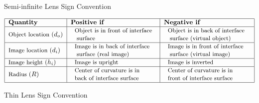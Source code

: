 \documentclass{article}
\begin{document}
Semi-infinite Lens Sign Convention

\[
\begin{tabular}{|l|l|l|}
\hline
\textbf{Quantity} & \textbf{Positive if} & \textbf{Negative if} \\ \hline
{\small Object location }$\left( d_{o}\right) $ & 
\begin{tabular}{l}
{\small Object is in front of interface} \\ 
{\small \ surface}%
\end{tabular}
& 
\begin{tabular}{l}
{\small Object is in back of interface} \\ 
{\small \ surface (virtual object)}%
\end{tabular}%
{\small \ } \\ \hline
{\small Image location }$\left( d_{i}\right) $ & 
\begin{tabular}{l}
{\small Image is in back of interface} \\ 
{\small \ surface (real image)}%
\end{tabular}
& 
\begin{tabular}{l}
{\small Image is in front of interface} \\ 
{\small \ surface (virtual image)}%
\end{tabular}
\\ \hline
{\small Image height }$\left( h_{i}\right) $ & 
\begin{tabular}{l}
{\small Image is upright}%
\end{tabular}
& 
\begin{tabular}{l}
{\small Image is inverted}%
\end{tabular}
\\ \hline
{\small Radius }$\left( R\right) $ & 
\begin{tabular}{l}
{\small Center of curvature is in} \\ 
{\small back of interface surface}%
\end{tabular}%
{\small \ } & 
\begin{tabular}{l}
{\small Center of curvature is in} \\ 
{\small front of interface surface}%
\end{tabular}%
{\small \ } \\ \hline
\end{tabular}%
\]

\vspace{0.75in}

Thin Lens Sign Convention
\end{document}
